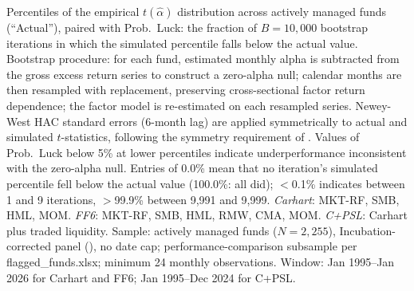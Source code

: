 \begin{table}[!htbp]
\centering
\def\sbetab{%
\tablefont
\begin{tabular}{rrrrrrr}
\toprule
 & \multicolumn{3}{c}{Actual $t(\hat{\alpha})$} & \multicolumn{3}{c}{Prob.\ Luck} \\
\cmidrule(lr){2-4} \cmidrule(lr){5-7}
Pctile & Carhart & FF6 & C+PSL & Carhart & FF6 & C+PSL \\
\midrule
 1 & -3.275 & -3.514 & -3.133 & 5.8\% & 3.5\% & 16.6\% \\
 5 & -2.177 & -2.439 & -2.138 & 9.2\% & 2.1\% & 12.5\% \\
 10 & -1.792 & -1.946 & -1.719 & 6.3\% & 2.5\% & 10.5\% \\
 50 & -0.264 & -0.400 & -0.232 & 13.8\% & 4.6\% & 16.0\% \\
 90 & 1.277 & 1.249 & 1.305 & 33.4\% & 24.6\% & 34.6\% \\
 95 & 1.635 & 1.732 & 1.734 & 23.2\% & 29.5\% & 33.2\% \\
 99 & 2.535 & 2.740 & 2.494 & 16.6\% & 26.3\% & 10.2\% \\
\bottomrule
\end{tabular}%
}\sbefit
\setlength{\tabletempwidth}{\wd\tabletempbox}
\ifdim\tabletempwidth>\linewidth\setlength{\tabletempwidth}{\linewidth}\fi
\begin{minipage}{\tabletempwidth}
\captionsetup{width=\linewidth}
\caption{\label{tab:bootstrap_comparison_robust}Bootstrap Percentile Comparison Across Factor Models}
\ifdim\wd\tabletempbox>\linewidth
  \resizebox{\linewidth}{!}{\usebox{\tabletempbox}}
\else
  \usebox{\tabletempbox}
\fi
\par\medskip
\begin{singlespace}\tablefont\noindent
Percentiles of the empirical $t(\hat{\alpha})$ distribution across actively managed funds (``Actual''), paired with Prob.\ Luck: the fraction of $B = 10{,}000$ \textcite{FamaFrench2010} bootstrap iterations in which the simulated percentile falls below the actual value. Bootstrap procedure: for each fund, estimated monthly alpha is subtracted from the gross excess return series to construct a zero-alpha null; calendar months are then resampled with replacement, preserving cross-sectional factor return dependence; the factor model is re-estimated on each resampled series. Newey-West HAC standard errors (6-month lag) are applied symmetrically to actual and simulated $t$-statistics, following the symmetry requirement of \textcite{FamaFrench2010}. Values of Prob.\ Luck below 5\% at lower percentiles indicate underperformance inconsistent with the zero-alpha null. Entries of 0.0\% mean that no iteration's simulated percentile fell below the actual value (100.0\%: all did); $<$0.1\% indicates between 1 and 9 iterations, $>$99.9\% between 9,991 and 9,999. \textit{Carhart}: MKT-RF, SMB, HML, MOM. \textit{FF6}: MKT-RF, SMB, HML, RMW, CMA, MOM. \textit{C+PSL}: Carhart plus \textcite{PastorStambaugh2003} traded liquidity. Sample: actively managed funds ($N = 2{,}255$), Incubation-corrected panel (\citealt{Evans2010}), no date cap; performance-comparison subsample per flagged\_funds.xlsx; minimum 24 monthly observations. Window: Jan 1995--Jan 2026 for Carhart and FF6; Jan 1995--Dec 2024 for C+PSL.

\end{singlespace}
\end{minipage}
\end{table}
